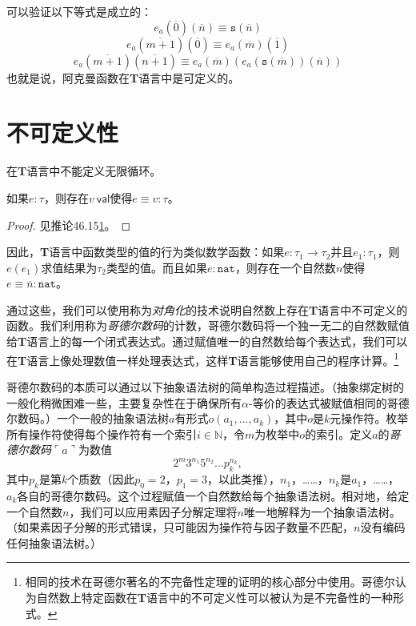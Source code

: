 可以验证以下等式是成立的：
\begin{equation}
e_a(\overline{0})(\overline{n})\equiv\mathtt{s}(\overline{n})
\end{equation}
\begin{equation}
e_a(\overline{m+1})(\overline{0})\equiv e_a(\overline{m})(\overline{1})
\end{equation}
\begin{equation}
e_a(\overline{m+1})(\overline{n+1})\equiv e_a(\overline{m})(e_a(\mathtt{s}(\overline{m}))(\overline{n}))
\end{equation}
也就是说，阿克曼函数在\textbf{T}语言中是可定义的。

\section{不可定义性}

在\textbf{T}语言中不能定义无限循环。

\begin{theorem}\label{theorem:T-val-equiv}
如果$e:\tau$，则存在$v\ \mathsf{val}$使得$e\equiv v:\tau$。
\end{theorem}

\begin{proof}
见推论46.15\ref{}。
\end{proof}

因此，\textbf{T}语言中函数类型的值的行为类似数学函数：如果$e:\tau_1\to\tau_2$并且$e_1:\tau_1$，则$e(e_1)$求值结果为$\tau_2$类型的值。而且如果$e:\mathtt{nat}$，则存在一个自然数$n$使得$e\equiv\overline{n}:\mathtt{nat}$。

通过这些，我们可以使用称为\textit{对角化}的技术说明自然数上存在\textbf{T}语言中不可定义的函数。我们利用称为\textit{哥德尔数码}的计数，哥德尔数码将一个独一无二的自然数赋值给\textbf{T}语言上的每一个闭式表达式。通过赋值唯一的自然数给每个表达式，我们可以在\textbf{T}语言上像处理数值一样处理表达式，这样\textbf{T}语言能够使用自己的程序计算。\footnote{相同的技术在哥德尔著名的不完备性定理的证明的核心部分中使用。哥德尔认为自然数上特定函数在\textbf{T}语言中的不可定义性可以被认为是不完备性的一种形式。}

哥德尔数码的本质可以通过以下抽象语法树的简单构造过程描述。（抽象绑定树的一般化稍微困难一些，主要复杂性在于确保所有$\alpha$-等价的表达式被赋值相同的哥德尔数码。）一个一般的抽象语法树$a$有形式$o(a_1,...,a_k)$，其中$o$是$k$元操作符。枚举所有操作符使得每个操作符有一个索引$i\in\mathbb{N}$，令$m$为枚举中$o$的索引。定义$a$的\textit{哥德尔数码}$\ulcorner a\urcorner$为数值
\begin{equation*}
2^{m}3^{n_1}5^{n_2}...p_{k}^{n_k},
\end{equation*}
其中$p_k$是第$k$个质数（因此$p_0=2$，$p_1=3$，以此类推），$n_1$，……，$n_k$是$a_1$，……，$a_k$各自的哥德尔数码。这个过程赋值一个自然数给每个抽象语法树。相对地，给定一个自然数$n$，我们可以应用素因子分解定理将$n$唯一地解释为一个抽象语法树。（如果素因子分解的形式错误，只可能因为操作符与因子数量不匹配，$n$没有编码任何抽象语法树。）

